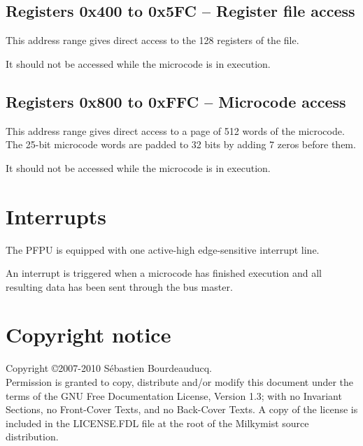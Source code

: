 \documentclass[a4paper,11pt]{article}
\begin{document}
\subsection{Registers 0x400 to 0x5FC -- Register file access}
This address range gives direct access to the 128 registers of the file.

It should not be accessed while the microcode is in execution.

\subsection{Registers 0x800 to 0xFFC -- Microcode access}
This address range gives direct access to a page of 512 words of the microcode. The 25-bit microcode words are padded to 32 bits by adding 7 zeros before them.

It should not be accessed while the microcode is in execution.

\section{Interrupts}
The PFPU is equipped with one active-high edge-sensitive interrupt line.

An interrupt is triggered when a microcode has finished execution and all resulting data has been sent through the bus master.

\section*{Copyright notice}
Copyright \copyright 2007-2010 S\'ebastien Bourdeauducq. \\
Permission is granted to copy, distribute and/or modify this document under the terms of the GNU Free Documentation License, Version 1.3; with no Invariant Sections, no Front-Cover Texts, and no Back-Cover Texts. A copy of the license is included in the LICENSE.FDL file at the root of the Milkymist source distribution.
\end{document}

